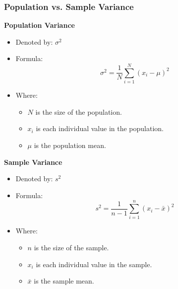 \documentclass[handout]{beamer} %
\begin{document}
\begin{frame}
\frametitle{Population vs. Sample Variance}

\begin{minipage}{0.48\textwidth}
\centering
\textbf{Population Variance}
\begin{itemize}
    \item Denoted by: $\sigma^2$
    \item Formula:
    \begin{equation*}
    \sigma^2 = \frac{1}{N} \sum_{i=1}^{N} (x_i - \mu)^2
    \end{equation*}
    \item Where:
    \begin{itemize}
        \item $N$ is the size of the population.
        \item $x_i$ is each individual value in the population.
        \item $\mu$ is the population mean.
    \end{itemize}
\end{itemize}
\end{minipage}
\hfill
\begin{minipage}{0.48\textwidth}
\centering
\vspace{-1em}
\textbf{Sample Variance}
\begin{itemize}
    \item Denoted by: $s^2$
    \item Formula:
    \begin{equation*}
    s^2 = \frac{1}{n-1} \sum_{i=1}^{n} (x_i - \bar{x})^2
    \end{equation*}
    \item Where:
    \begin{itemize}
        \item $n$ is the size of the sample.
        \item $x_i$ is each individual value in the sample.
        \item $\bar{x}$ is the sample mean.
    \end{itemize}
\end{itemize}
\end{minipage}

\end{frame}
\end{document}
